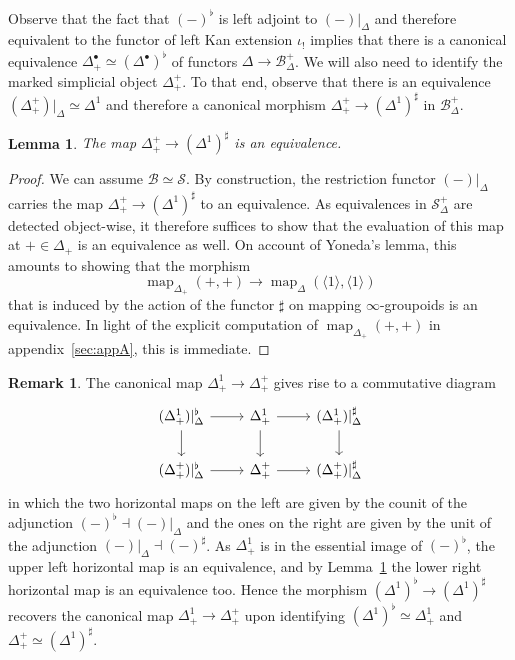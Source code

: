 \documentclass[reqno]{amsart}
\numberwithin{equation}{subsection}
\theoremstyle{plain}
\newtheorem{lemma}[equation]{Lemma}
\theoremstyle{definition}
\newtheorem{remark}[equation]{Remark}
\let\scr=\mathcal
\def\BB{\scr B}
\def\SS{\scr S}
\DeclareMathOperator{\Map}{map}
\newcommand{\ord}[1]{\langle#1\rangle}
\newcommand{\map}[1]{\Map_{#1}}
\newcommand{\mSimp}[1]{#1_{\Delta}^+}
\begin{document}
Observe that the fact that $(-)^\flat$ is left adjoint to $(-)\vert_{\Delta}$ and therefore equivalent to the functor of left Kan extension $\iota_!$ implies that there is a canonical equivalence $\Delta_+^\bullet\simeq (\Delta^\bullet)^\flat$ of functors $\Delta\to \mSimp\BB$. We will also need to identify the marked simplicial object $\Delta^+_+$. To that end, observe that there is an equivalence $(\Delta_+^+)\vert_{\Delta}\simeq\Delta^1$ and therefore a canonical morphism $\Delta_+^+\to (\Delta^1)^\sharp$ in $\mSimp\BB$.
\begin{lemma}
	\label{lem:walkingMarkedEdge}
	The map $\Delta^+_+\to (\Delta^1)^\sharp$ is an equivalence.
\end{lemma}
\begin{proof}
	We can assume $\BB\simeq\SS$. By construction, the restriction functor $(-)\vert_{\Delta}$ carries the map $\Delta^+_+\to (\Delta^1)^\sharp$ to an equivalence. As equivalences in $\mSimp\SS$ are detected object-wise, it therefore suffices to show that the evaluation of this map at $+\in\Delta_+$ is an equivalence as well. On account of Yoneda's lemma, this amounts to showing that the morphism
	\begin{equation*}
	\map{\Delta_+}(+,+)\to\map{\Delta}(\ord{1},\ord{1})
	\end{equation*}
	that is induced by the action of the functor $\sharp$ on mapping $\infty$-groupoids is an equivalence. In light of the explicit computation of $\map{\Delta_+}(+,+)$ in appendix~\ref{sec:appA}, this is immediate.
	\end{proof}
\begin{remark}
	\label{rem:identificationMapFlatSharp}
	The canonical map $\Delta^1_+\to\Delta^+_+$ gives rise to a commutative diagram
	\begin{equation*}
	\begin{tikzcd}
	(\Delta^1_+)\vert_\Delta^\flat\arrow[r] \arrow[d] & \Delta^1_+\arrow[r]\arrow[d] & (\Delta^1_+)\vert_{\Delta}^\sharp\arrow[d]\\
	(\Delta^+_+)\vert_{\Delta}^\flat\arrow[r]& \Delta^+_+\arrow[r]& (\Delta^+_+)\vert_{\Delta}^\sharp
	\end{tikzcd}
	\end{equation*}
	in which the two horizontal maps on the left are given by the counit of the adjunction $(-)^\flat\dashv (-)\vert_{\Delta}$ and the ones on the right are given by the unit of the adjunction $(-)\vert_{\Delta}\dashv (-)^\sharp$. As $\Delta^1_+$ is in the essential image of $(-)^\flat$, the upper left horizontal map is an equivalence, and by Lemma~\ref{lem:walkingMarkedEdge} the lower right horizontal map is an equivalence too. Hence the morphism $(\Delta^1)^\flat\to(\Delta^1)^\sharp$ recovers the canonical map $\Delta^1_+\to\Delta^+_+$ upon identifying $(\Delta^1)^\flat\simeq \Delta^1_+$ and $\Delta^+_+\simeq (\Delta^1)^\sharp$.
\end{remark}
\end{document}
